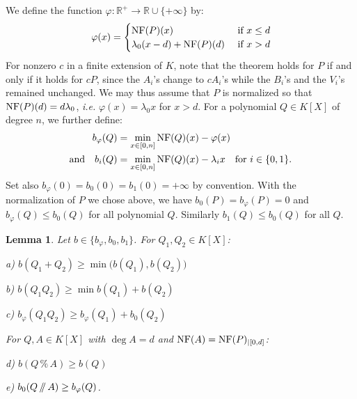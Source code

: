 \documentclass{sig-alternate-05-2015}
\newcommand{\R}{\mathbb R}
\newcommand{\NF}{\text{\rm NF}}
\renewcommand{\mod}{\,\%\,}
\renewcommand{\div}{\,/\hspace{-0.3em}/\,}
\newtheorem{lem}[theo]{Lemma}
\theoremstyle{definition}
\begin{document}
We define the function $\varphi : \R^+ \to \R 
\cup \{+\infty\}$ by:
\begin{equation} \label{eqdef:functionphi}
\varphi(x) = \begin{cases} \NF(P)(x) &\mbox{ if $x \leq d$} \\
\lambda_0 (x - d) + \NF(P)(d) &\mbox{ if $x > d$} \end{cases}
\end{equation}
For nonzero $c$ in a finite extension of $K$, note that the theorem holds
for $P$ if and only if it holds for $cP$, since the $A_i$'s change to $cA_i$'s
while the $B_i$'s and the $V_i$'s remained unchanged. We may thus assume
that $P$ is normalized so that  $\NF(P)(d) = d \lambda_0$,
\emph{i.e.} $\varphi(x) = \lambda_0 x$ for $x > d$.
For a polynomial $Q \in K[X]$ of degree $n$, we further define:
\begin{align}
b_\varphi(Q) & = \min_{x \in [0,n]} \NF(Q)(x) - \varphi(x) 
\label{eqdef:bphi} \\
\text{and} \quad
b_i(Q) & = \min_{x \in [0,n]} \NF(Q)(x) - \lambda_i x
\quad \text{for } i \in \{0,1\}.
\label{eqdef:b0}
\end{align}
Set also $b_\varphi(0) = b_0(0) = b_1(0) = +\infty$ by convention.
With the normalization of $P$ we chose above, we have $b_0(P)
= b_\varphi(P) = 0$ and $b_\varphi(Q) \leq b_0(Q)$ for all polynomial
$Q$. Similarly $b_1(Q) \leq b_0(Q)$ for all $Q$.

\begin{lem}
\label{lem:bphib0}
Let $b \in \{b_\varphi, b_0, b_1\}$. For $Q_1, Q_2 \in K[X]$:

\smallskip

a) $b(Q_1+Q_2) \geq \min \big(b(Q_1), b(Q_2)\big)$

\smallskip

b) $b(Q_1Q_2) \geq \min b(Q_1) + b(Q_2)$ 

\smallskip

c) $b_\varphi(Q_1 Q_2) \geq b_\varphi(Q_1) + b_0(Q_2)$

\smallskip

\noindent
For $Q, A \in K[X]$ with $\deg A = d$ and $\NF(A) =
\NF(P)_{|[0,d]}$:

\smallskip

d) $b(Q \mod A) \geq b(Q)$

\smallskip

e) $b_0(Q \div A) \geq b_\varphi(Q)$.
\end{lem}
\end{document}

